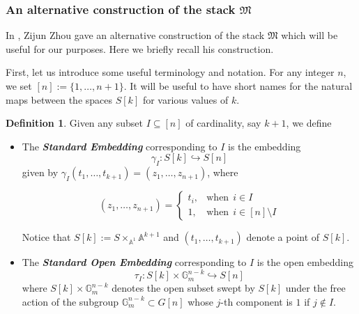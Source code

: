 \documentclass[11pt]{amsart}
\theoremstyle{plain}
\numberwithin{equation}{section}
\theoremstyle{definition}
\newtheorem{Def}{Definition}[section]
\theoremstyle{plain}
\begin{document}
\subsubsection{\textbf{An alternative construction of the stack \texorpdfstring{$\mathfrak M$}{M}}}In \cite[Definition 2.22]{Z}, Zijun Zhou gave an alternative construction of the stack $\mathfrak M$ which will be useful for our purposes. Here we briefly recall his construction.

\smallskip

First, let us introduce some useful terminology and notation. For any integer $n$, we set $[n]:=\{1, \dots, n+1\}$. It will be useful to have short names for the natural maps between the spaces $S[k]$ for various values of $k$.

\begin{Def}
Given any subset $I\subseteq [n]$ of cardinality, say $k+1$, we define
\begin{itemize}
\item The \emph{\bfseries Standard Embedding} corresponding to  $I$ is the embedding
\begin{equation}
\gamma_I: S[k]\hookrightarrow S[n]
\end{equation}
given by $\gamma_I(t_1,\dots, t_{k+1})=(z_1, \dots, z_{n+1})$, where

$$
(z_1, \dots, z_{n+1})=\begin{cases}
			t_i, & \text{when} ~~i\in I\\
            1, & \text{when} ~~ i\in [n]\setminus I
		 \end{cases}
$$

Notice that $S[k]:=S\times_{\mathbb A^1} \mathbb A^{k+1}$ and $(t_1, \dots, t_{k+1})$ denote a point of $S[k]$. 

\smallskip

\item The \emph{\bfseries Standard Open Embedding} corresponding to $I$   is the open embedding
\begin{equation}
\tau_I: S[k]\times \mathbb{G}_m^{n-k}\hookrightarrow S[n]
\end{equation}
where $S[k]\times \mathbb{G}_m^{n-k}$ denotes the open subset swept  by $S[k]$ under  the free action of the subgroup $\mathbb{G}_m^{n-k}\subset G[n]$ whose $j$-th component is $1$ if $j\notin I$.
\end{itemize}
\end{Def}

\smallskip
\end{document}
